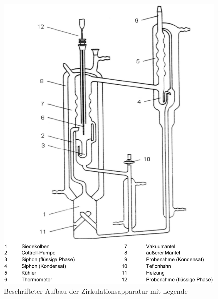 \begin{figure}[h!]
	\centering
	\includegraphics[width=0.7\linewidth]{img/zirkulationsapparatur}
	\caption{Beschrifteter Aufbau der Zirkulationsapparatur mit Legende}
	\label{fig:zirkulationsapparatur}
\end{figure}